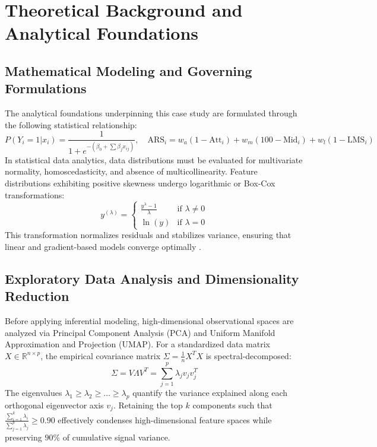 \section{Theoretical Background and Analytical Foundations}

\subsection{Mathematical Modeling and Governing Formulations}
The analytical foundations underpinning this case study are formulated through the following statistical relationship:
\begin{equation}
  P(Y_i=1|x_i) = \frac{1}{1 + e^{-(\beta_0 + \sum \beta_j x_{ij})}}, \quad \text{ARS}_i = w_a (1 - \text{Att}_i) + w_m (100 - \text{Mid}_i) + w_l (1 - \text{LMS}_i)
\label{eq:core_math}
\end{equation}
In statistical data analytics, data distributions must be evaluated for multivariate normality, homoscedasticity, and absence of multicollinearity. Feature distributions exhibiting positive skewness undergo logarithmic or Box-Cox transformations:
\begin{equation}
  y^{(\lambda)} = \begin{cases} \frac{y^\lambda - 1}{\lambda} & \text{if } \lambda \neq 0 \\ \ln(y) & \text{if } \lambda = 0 \end{cases}
\end{equation}
This transformation normalizes residuals and stabilizes variance, ensuring that linear and gradient-based models converge optimally \cite{wickham2016r}.

\subsection{Exploratory Data Analysis and Dimensionality Reduction}
Before applying inferential modeling, high-dimensional observational spaces are analyzed via Principal Component Analysis (PCA) and Uniform Manifold Approximation and Projection (UMAP). For a standardized data matrix $X \in \mathbb{R}^{n \times p}$, the empirical covariance matrix $\Sigma = \frac{1}{n} X^T X$ is spectral-decomposed:
\begin{equation}
  \Sigma = V \Lambda V^T = \sum_{j=1}^p \lambda_j v_j v_j^T
\end{equation}
The eigenvalues $\lambda_1 \ge \lambda_2 \ge \dots \ge \lambda_p$ quantify the variance explained along each orthogonal eigenvector axis $v_j$. Retaining the top $k$ components such that $\frac{\sum_{i=1}^k \lambda_i}{\sum_{j=1}^p \lambda_j} \ge 0.90$ effectively condenses high-dimensional feature spaces while preserving $90\%$ of cumulative signal variance.


